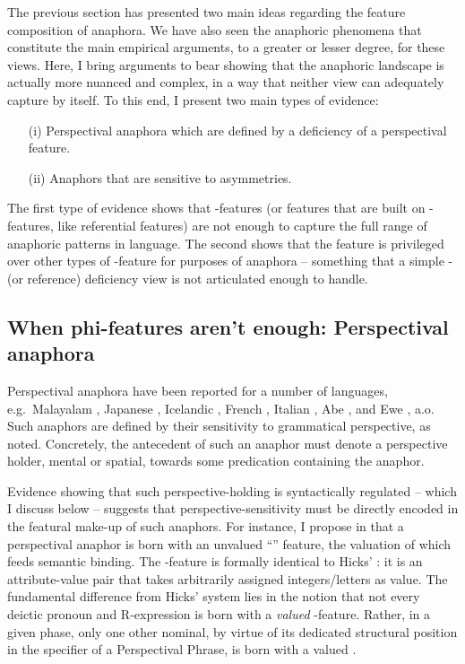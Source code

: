 \documentclass[output=paper, modfonts, nonflat]{langsci/langscibook}
\begin{document}
The previous section has presented two main ideas regarding the
feature composition of anaphora. We have also seen the anaphoric
phenomena that constitute the main empirical arguments, to a greater
or lesser degree, for these views. Here, I bring arguments to bear
showing that the anaphoric landscape is actually more nuanced and
complex, in a way that neither view can adequately capture by
itself. To this end, I present two main types of evidence:
\begin{itemize}
\item[(i)] Perspectival anaphora which are defined by a deficiency of
  a perspectival feature.
  \item[(ii)] Anaphors that are sensitive to \person{} asymmetries. 
  \end{itemize}
  The first type of evidence shows that \ph-features (or features that
  are built on \ph-features, like referential features) are not enough
  to capture the full range of anaphoric patterns in language. The
  second shows that the \person{} feature is privileged over other
  types of \ph-feature for purposes of anaphora -- something that a
  simple \ph- (or reference) deficiency view is not articulated enough
  to handle. 
  

 \subsection{When phi-features aren't enough: Perspectival anaphora}

 Perspectival anaphora have been reported for a number of languages, e.g.\ Malayalam \citep{jayaseelan:1997}, Japanese
 \citep{kuno:1987, nishigauchi:2014}, Icelandic
 \citep{hellan:1988, sigurdsson:1991}, French
 \citep{charnavel:2016}, Italian \citep{giorgi:2010}, Abe
 \citep{koopmansportiche:1989}, and Ewe \citep{pearson:2013},
 a.o. Such anaphors are defined by their sensitivity to grammatical
 perspective, as noted. Concretely, the antecedent of such an anaphor
 must denote a perspective holder, mental or spatial, towards some
 predication containing the anaphor.

 Evidence showing that such perspective-holding is syntactically
 regulated -- which I discuss below -- suggests that
 perspective-sensitivity must be directly encoded in the featural
 make-up of such anaphors.  For instance, I propose in
 \citet{sundaresan:2012, sundaresan:2018} that a perspectival anaphor
 is born with an unvalued ``\dep'' feature, the valuation of which
 feeds semantic binding. The \dep-feature is formally identical to
 Hicks' \var: it is an attribute-value pair that takes arbitrarily
 assigned integers/letters as value.  The fundamental difference from
 Hicks' system lies in the notion that not every deictic pronoun and
 R-expression is born with a \emph{valued} \dep-feature. Rather, in a
 given phase, only one other nominal, by virtue of its dedicated
 structural position in the specifier of a Perspectival Phrase, is
 born with a valued \dep.
\end{document}
